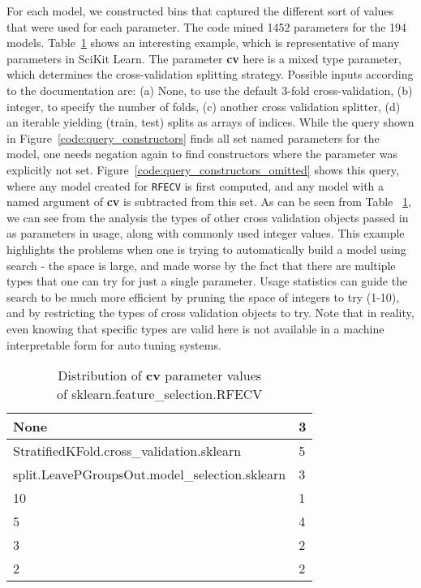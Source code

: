 For each model, we constructed bins that captured the different sort of values that were used for each parameter.  The code mined 1452 parameters for the 194 models.  Table~\ref{hyper-parameter optimization} shows an interesting example, which is representative of many parameters in SciKit Learn.  The parameter \textbf{cv} here is a mixed type parameter, which determines the cross-validation splitting strategy. Possible inputs according to the documentation are: (a) None, to use the default 3-fold cross-validation, (b) integer, to specify the number of folds, (c) another cross validation splitter, (d) an iterable yielding (train, test) splits as arrays of indices.  While the query shown in Figure~\ref{code:query_constructors} finds all set named parameters for the model, one needs negation again to find constructors where the parameter was explicitly not set.  Figure~\ref{code:query_constructors_omitted} shows this query, where any model created for {\tt RFECV} is first computed, and any model with a named argument of \textbf{cv} is subtracted from this set.  As can be seen from Table ~\ref{hyper-parameter optimization}, we can see from the analysis the types of other cross validation objects passed in as parameters in usage, along with commonly used integer values.  This example highlights the problems when one is trying to automatically build a model using search - the space is large, and made worse by the fact that there are multiple types that one can try for just a single parameter.  Usage statistics can guide the search to be much more efficient by pruning the space of integers to try (1-10), and by restricting the types of cross validation objects to try.  Note that in reality, even knowing that specific types are valid here is not available in a machine interpretable form for auto tuning systems.

\begin{table}
\begin{center}
\begin{tabular}{ |l|l|} 
 \hline
None & 3 \\ \hline
StratifiedKFold.cross\_validation.sklearn & 5 \\ \hline
split.LeavePGroupsOut.model\_selection.sklearn & 3 \\ \hline
10 & 1 \\ \hline
5 & 4 \\ \hline
3 & 2 \\ \hline
2 & 2 \\ \hline
\hline
\end{tabular}
\end{center}
\caption{Distribution of \textbf{cv} parameter values\\
of sklearn.feature\_selection.RFECV}
\label{hyper-parameter optimization}
\end{table}
